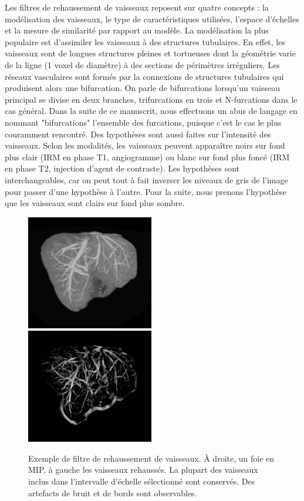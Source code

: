 Les filtres de rehaussement de vaisseaux reposent sur quatre concepts : la modélisation des vaisseaux, le type de caractéristiques utilisées, l'espace d'échelles et la mesure de similarité par rapport au modèle. La modélisation la plus populaire est d'assimiler les vaisseaux à des structures tubulaires. En effet, les vaisseaux sont de longues structures pleines et tortueuses dont la géométrie varie de la ligne (1 voxel de diamètre) à des sections de périmètres irréguliers. Les réseaux vasculaires sont formés par la connexions de structures tubulaires qui produisent alors une bifurcation. On parle de  bifurcations lorsqu'un vaisseau principal se divise en deux branches, trifurcations en trois et N-furcations dans le cas général. Dans la suite de ce manuscrit, nous effectuons un abus de langage en nommant "bifurcations" l'ensemble des furcations, puisque c'est le cas le plus couramment rencontré. Des hypothèses sont aussi faites sur l'intensité des vaisseaux. Selon les modalités, les vaisseaux peuvent apparaître noirs sur fond plus clair (IRM en phase T1, angiogramme) ou blanc sur fond plus foncé (IRM en phase T2, injection d'agent de contraste). Les hypothèses sont interchangeables, car on peut tout à fait inverser les niveaux de gris de l'image pour passer d'une hypothèse à l'autre. Pour la suite, nous prenons l'hypothèse que les vaisseaux sont clairs sur fond plus sombre.

\begin{figure}[h]
  \centering
  \includegraphics[height=5cm]{Images/enhancement_part1.png}
  \includegraphics[height=5cm]{Images/enhancement_part2.png}
  \caption{Exemple de filtre de rehaussement de vaisseaux. À droite, un foie en MIP, à gauche les vaisseaux rehaussés. La plupart des vaisseaux inclus dans l'intervalle d'échelle sélectionné sont conservés. Des artefacts de bruit et de bords sont observables.}
  \label{fig:exemple_vesselness}
\end{figure}

